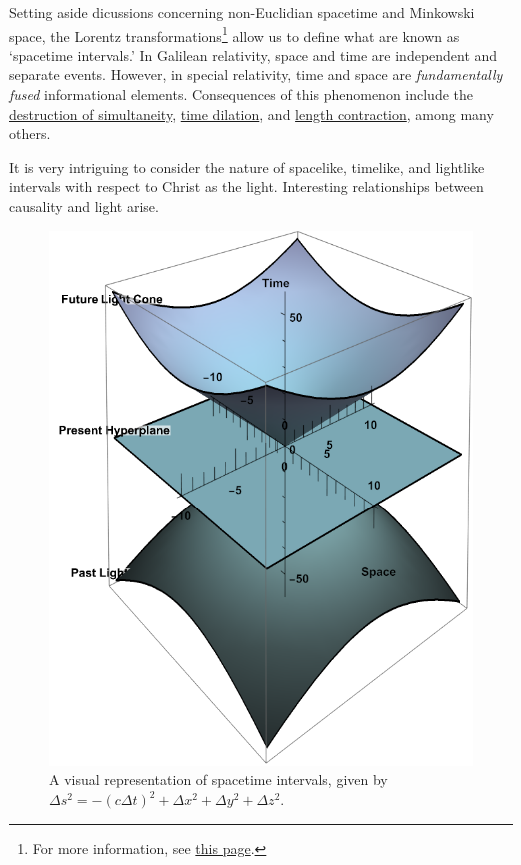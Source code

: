 \documentclass{article}
\begin{document}
                    Setting aside dicussions concerning non-Euclidian spacetime and Minkowski space, the Lorentz transformations\footnote{For more information, see \href{https://en.wikipedia.org/wiki/Lorentz_transformation}{this page}.}
                    allow us to define what are known as `spacetime intervals.' In Galilean relativity, space and time are independent and separate events. However, in special relativity, time and space are \emph{fundamentally fused} informational elements.
                    Consequences of this phenomenon include the \href{https://en.wikipedia.org/wiki/Relativity_of_simultaneity}{destruction of simultaneity}, \href{https://en.wikipedia.org/wiki/Time_dilation}{time dilation}, and \href{https://en.wikipedia.org/wiki/Length_contraction}{length contraction}, among many others.
                    
                    It is very intriguing to consider the nature of spacelike, timelike, and lightlike intervals with respect to Christ as the light. Interesting relationships between causality and light arise. 

                    \begin{figure}
                        \includegraphics[scale = 0.4]{lightcone.png}
                        \caption{A visual representation of spacetime intervals, given by $\Delta s^2 = -(c\Delta t)^2 + \Delta x^2 + \Delta y^2 + \Delta z^2$.}
                    \end{figure}\label{fig:3}
\end{document}
